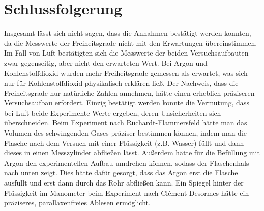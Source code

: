 \documentclass[
	a4paper,
	12pt,
	pagesize,
	ngerman
]{scrartcl}
\begin{document}
	\section{Schlussfolgerung}
	Insgesamt lässt sich nicht sagen, dass die Annahmen bestätigt werden konnten, da die Messwerte der Freiheitsgrade nicht mit den Erwartungen übereinstimmen.
	Im Fall von Luft bestätigten sich die Messwerte der beiden Versuchsaufbauten zwar gegenseitig, aber nicht den erwarteten Wert.
	Bei Argon und Kohlenstoffdioxid wurden mehr Freiheitsgrade gemessen als erwartet, was sich nur für Kohlenstoffdioxid physikalisch erklären ließ.
	Der Nachweis, dass die Freiheitsgrade nur natürliche Zahlen annehmen, hätte einen erheblich präziseren Versuchsaufbau erfordert.
	Einzig bestätigt werden konnte die Vermutung, dass bei Luft beide Experimente Werte ergeben, deren Unsicherheiten sich überschneiden. 
	Beim Experiment nach Rüchardt-Flammersfeld hätte man das Volumen des schwingenden Gases präziser bestimmen können, indem man die Flasche nach dem Versuch mit einer Flüssigkeit (z.B. Wasser) füllt und dann dieses in einen Messzylinder abfließen lässt.
	Außerdem hätte für die Befüllung mit Argon den experimentellen Aufbau umdrehen können, sodass der Flaschenhals nach unten zeigt.
	Dies hätte dafür gesorgt, dass das Argon erst die Flasche ausfüllt und erst dann durch das Rohr abfließen kann.
	Ein Spiegel hinter der Flüssigkeit im Manometer beim Experiment nach Clément-Desormes hätte ein präziseres, parallaxenfreies Ablesen ermöglicht.
	\newpage
	\printbibliography
\end{document}

